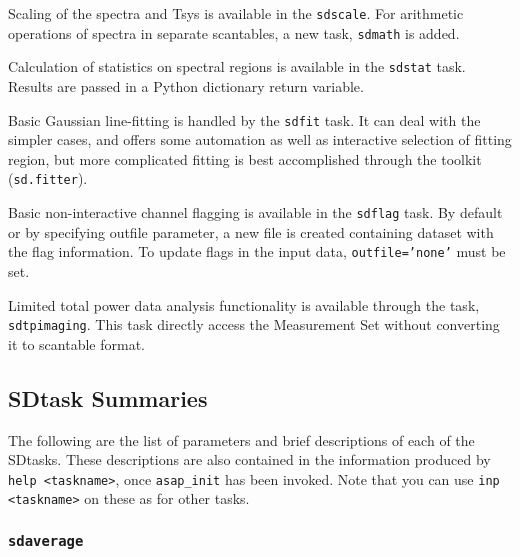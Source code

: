 Scaling of the spectra and Tsys is available in the {\tt sdscale}.
For arithmetic operations of spectra in separate scantables, a new task, {\tt sdmath}
is added. 

Calculation of statistics on spectral regions is available in the {\tt sdstat} task.
Results are passed in a Python dictionary return variable.

Basic Gaussian line-fitting is handled by the {\tt sdfit} task.  It can deal
with the simpler cases, and offers some automation as well as interactive 
selection of fitting region, but more complicated
fitting is best accomplished through the toolkit ({\tt sd.fitter}).

Basic non-interactive channel flagging is available in the {\tt sdflag} task.
By default or by specifying outfile parameter, a new file is created containing 
dataset with the flag information. To update flags in the input data,
{\tt outfile='none'} must be set.

Limited total power data analysis functionality is available through 
the task, {\tt sdtpimaging}. This task directly access the Measurement
Set without converting it to scantable format.
\newpage 
\subsection{SDtask Summaries}
\label{section:sd.sdtasks.tasks}

The following are the list of parameters and
brief descriptions of each of the SDtasks.
These descriptions are also contained in the information produced
by {\tt help <taskname>}, once {\tt asap\_init} has been invoked.
Note that you can use {\tt inp <taskname>} on these as for other tasks.

\subsubsection{{\tt sdaverage}}
\label{section:sd.sdtasks.tasks.sdaverage}

